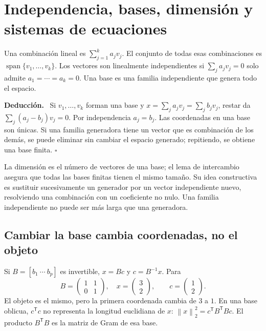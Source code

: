 \documentclass[11pt,a4paper]{article}
\newcommand{\T}{^{\mathsf T}}
\newcommand{\norm}[1]{\left\lVert #1\right\rVert}
\DeclareMathOperator{\spanop}{span}
\newenvironment{deduccion}{\par\textbf{Deducción.}\ }{\hfill$\square$\par}
\theoremstyle{definition}
\begin{document}
\section{Independencia, bases, dimensión y sistemas de ecuaciones}
Una combinación lineal es $\sum_{j=1}^k a_jv_j$. El conjunto de todas esas combinaciones es $\spanop\{v_1,\ldots,v_k\}$. Los vectores son linealmente independientes si $\sum_j a_jv_j=0$ solo admite $a_1=\cdots=a_k=0$. Una base es una familia independiente que genera todo el espacio.
\begin{deduccion}
Si $v_1,\ldots,v_k$ forman una base y $x=\sum_j a_jv_j=\sum_j b_jv_j$, restar da $\sum_j(a_j-b_j)v_j=0$. Por independencia $a_j=b_j$. Las coordenadas en una base son únicas. Si una familia generadora tiene un vector que es combinación de los demás, se puede eliminar sin cambiar el espacio generado; repitiendo, se obtiene una base finita.
\end{deduccion}
La dimensión es el número de vectores de una base; el lema de intercambio asegura que todas las bases finitas tienen el mismo tamaño. Su idea constructiva es sustituir sucesivamente un generador por un vector independiente nuevo, resolviendo una combinación con un coeficiente no nulo. Una familia independiente no puede ser más larga que una generadora.
\subsection{Cambiar la base cambia coordenadas, no el objeto}
Si $B=[b_1\ \cdots\ b_p]$ es invertible, $x=Bc$ y $c=B^{-1}x$. Para
\[
B=\begin{pmatrix}1&1\\0&1\end{pmatrix},\quad x=\begin{pmatrix}3\\2\end{pmatrix},
\qquad c=\begin{pmatrix}1\\2\end{pmatrix}.
\]
El objeto es el mismo, pero la primera coordenada cambia de $3$ a $1$. En una base oblicua, $c\T c$ no representa la longitud euclidiana de $x$: $\norm{x}_2^2=c\T B\T Bc$. El producto $B\T B$ es la matriz de Gram de esa base.
\end{document}
